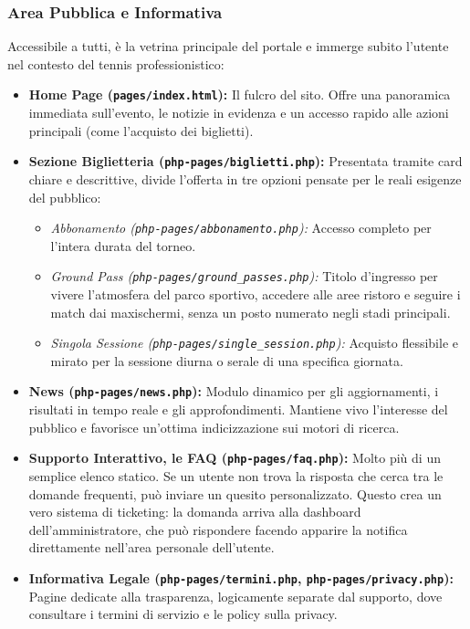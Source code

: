 \documentclass[11pt,a4paper]{article}
\begin{document}
\subsubsection*{Area Pubblica e Informativa}
Accessibile a tutti, è la vetrina principale del portale e immerge subito l'utente nel contesto del tennis professionistico:
\begin{itemize}
    \item \textbf{Home Page (\texttt{pages/index.html}):} Il fulcro del sito. Offre una panoramica immediata sull'evento, le notizie in evidenza e un accesso rapido alle azioni principali (come l'acquisto dei biglietti).
    \item \textbf{Sezione Biglietteria (\texttt{php-pages/biglietti.php}):} Presentata tramite card chiare e descrittive, divide l'offerta in tre opzioni pensate per le reali esigenze del pubblico:
    \begin{itemize}
        \item \textit{Abbonamento (\texttt{php-pages/abbonamento.php}):} Accesso completo per l'intera durata del torneo.
        \item \textit{Ground Pass (\texttt{php-pages/ground\_passes.php}):} Titolo d'ingresso per vivere l'atmosfera del parco sportivo, accedere alle aree ristoro e seguire i match dai maxischermi, senza un posto numerato negli stadi principali.
        \item \textit{Singola Sessione (\texttt{php-pages/single\_session.php}):} Acquisto flessibile e mirato per la sessione diurna o serale di una specifica giornata.
    \end{itemize}
    \item \textbf{News (\texttt{php-pages/news.php}):} Modulo dinamico per gli aggiornamenti, i risultati in tempo reale e gli approfondimenti. Mantiene vivo l'interesse del pubblico e favorisce un'ottima indicizzazione sui motori di ricerca.
    \item \textbf{Supporto Interattivo, le FAQ (\texttt{php-pages/faq.php}):} Molto più di un semplice elenco statico. Se un utente non trova la risposta che cerca tra le domande frequenti, può inviare un quesito personalizzato. Questo crea un vero sistema di ticketing: la domanda arriva alla dashboard dell'amministratore, che può rispondere facendo apparire la notifica direttamente nell'area personale dell'utente.
    \item \textbf{Informativa Legale (\texttt{php-pages/termini.php}, \texttt{php-pages/privacy.php}):} Pagine dedicate alla trasparenza, logicamente separate dal supporto, dove consultare i termini di servizio e le policy sulla privacy.
\end{itemize}
\end{document}
